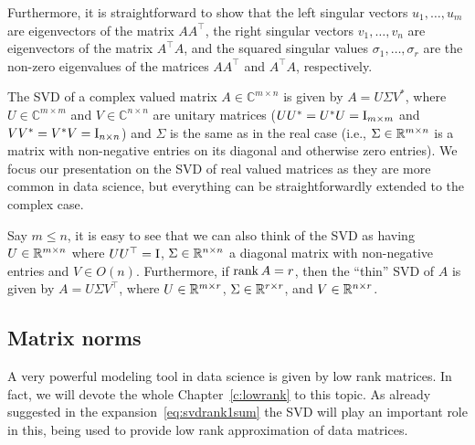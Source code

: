 Furthermore, it is straightforward to show that the left singular vectors $u_1,\dots,u_m$ are eigenvectors of the matrix $A A^\top  $, the 
right singular vectors $v_1,\dots,v_n$ are eigenvectors of the matrix $A^\top   A$, and the squared singular values $\sigma_1,\dots,\sigma_r$ are the non-zero eigenvalues of the matrices $A A^\top  $ and $A^\top   A$, respectively.

\begin{remark}
The SVD of a complex valued matrix $A \in \mathbb{C}^{m\times n}$ is given by $A = U \Sigma V^*$, where $U \in \mathbb{C}^{m\times m}$ and $V \in \mathbb{C}^{n\times n}$ are unitary matrices ($UU^* = U^* U = \operatorname{I}_{m\times m}$ and $VV^* = V^*V = \operatorname{I}_{n\times n}$) and $\Sigma$ is the same as in the real case (i.e., $\Sigma\in\mathbb{R}^{m\times n}$ is a matrix with non-negative entries on its diagonal and otherwise zero entries). We focus our presentation on the SVD of real valued matrices as they are more common in data science, but everything can be straightforwardly extended to the complex case.
\end{remark}

\begin{remark}
 Say $m\leq n$, it is easy to see that we can also think of the SVD as having $U\in\mathbb{R}^{m\times n}$ where $UU^\top  =\operatorname{I}$, $\Sigma \in\mathbb{R}^{n\times n}$ a diagonal matrix with non-negative entries and $V\in O(n)$. Furthermore, if $\operatorname{rank} A = r$, then the ``thin'' SVD of $A$ is given by $A=U\Sigma V^\top  $, where $U \in \mathbb{R}^{m \times r}$, $\Sigma \in \mathbb{R}^{r 
 \times r}$, and $V \in \mathbb{R}^{n \times r}$.
\end{remark}




\subsection{Matrix norms}

A very powerful modeling tool in data science is given by low rank matrices. In fact, we will devote the whole Chapter~\ref{c:lowrank} to this topic. As already suggested in the expansion~\eqref{eq:svdrank1sum} the SVD will play an important role in this, being used to provide low rank approximation of data matrices.

